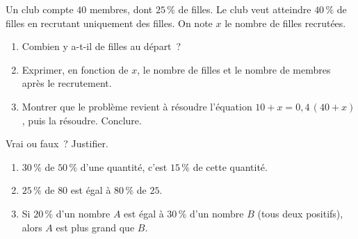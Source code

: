 \documentclass[a4paper,11pt,fleqn]{article}
\newcommand{\pt}[1][1.6cm]{\makebox[#1]{\dotfill}}
\newcommand{\ligne}{\par\smallskip\makebox[\linewidth]{\dotfill}\par}
\begin{document}
\begin{EXO}{}{}
Un club compte $40$ membres, dont $25\,\%$ de filles. Le club veut atteindre $40\,\%$ de filles en recrutant uniquement des filles. On note $x$ le nombre de filles recrutées.
\begin{enumerate}[itemsep=0.3em]
	\item Combien y a-t-il de filles au départ~? \pt[2cm]
	\item Exprimer, en fonction de $x$, le nombre de filles et le nombre de membres après le recrutement.
	\ligne
	\item Montrer que le problème revient à résoudre l'équation $10 + x = 0{,}4\,(40 + x)$, puis la résoudre. Conclure.
	\ligne\ligne\ligne
\end{enumerate}
\end{EXO}

\begin{EXO}{}{}
Vrai ou faux~? Justifier.
\begin{enumerate}[label=\textbf{\alph*.}, itemsep=0.3em]
	\item $30\,\%$ de $50\,\%$ d'une quantité, c'est $15\,\%$ de cette quantité.
	\ligne
	\item $25\,\%$ de $80$ est égal à $80\,\%$ de $25$.
	\ligne
	\item Si $20\,\%$ d'un nombre $A$ est égal à $30\,\%$ d'un nombre $B$ (tous deux positifs), alors $A$ est plus grand que $B$.
	\ligne
\end{enumerate}
\end{EXO}

\ifdefined\ELEVE\else
\clearpage
\end{document}
